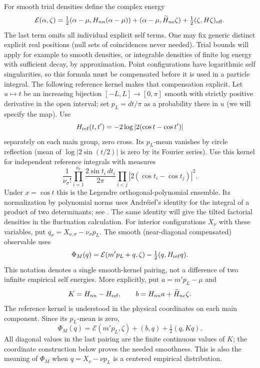 For smooth trial densities define the complex energy
\[
 \mathcal E(\alpha,\zeta)=\tfrac12(\alpha-\mu,H_{nn}(\alpha-\mu))
 +(\alpha-\mu,\widetilde H_{ne}\zeta)+\tfrac12(\zeta,H\zeta)_{\rm off}.
\]
The last term omits all individual explicit self terms. One may fix generic distinct explicit real positions (null sets of coincidences never needed). Trial bounds will apply for example to smooth densities, or integrable densities of finite log energy with sufficient decay, by approximation. Point configurations have logarithmic self singularities, so this
formula must be compensated before it is used in a particle integral.
The following reference kernel makes that compensation explicit. Let \(u\mapsto t\) be an increasing bijection \([-L,L]\to[0,\pi]\) smooth with strictly positive derivative in the open interval; set \(p_L=dt/\pi\) as a probability there in \(u\) (we will specify the map). Use
\[
 H_{\rm ref}(t,t')=-2\log|2(\cos t-\cos t')|
\]
separately on each main group, zero cross. Its \(p_L\)-mean vanishes by circle reflection (mean of \(\log|2\sin(t/2)|\) is zero by its Fourier series). Use this kernel for independent reference integrals with measures
\[
 \frac{1}{\nu_\sigma!}\prod_{i=1}^{\nu_\sigma}\frac{2\sin t_i\,dt_i}{2\pi}
 \prod_{i<j}|2(\cos t_i-\cos t_j)|^2 .
\]
Under $x=\cos t$ this is the Legendre orthogonal-polynomial ensemble.
Its normalization by polynomial norms uses Andr\'eief's identity for
the integral of a product of two determinants; see
\cite[equations (1.3), (3.1), and Section 5]{TracyWidom1998}.
The same identity will give
the tilted factorial densities in the fluctuation calculation.
For interior configurations \(X_\nu\) with these variables, put \(q_\sigma=X_{\nu,\sigma}-\nu_\sigma p_L\). The smooth (near-diagonal compensated) observable uses
\[
 \Phi_M(q)=\mathcal E(m'p_L+q,\zeta)-\tfrac12(q,H_{\rm ref}q).
\]
This notation denotes a single smooth-kernel pairing, not a difference
of two infinite empirical self energies. More explicitly, put
\(a=m'p_L-\mu\) and
\[
 K=H_{nn}-H_{\rm ref},\qquad
 b=H_{nn}a+\widetilde H_{ne}\zeta.
\]
The reference kernel is understood in the physical coordinates on
each main component. Since its \(p_L\)-mean is zero,
\[
 \Phi_M(q)=\mathcal E(m'p_L,\zeta)+(b,q)+\tfrac12(q,Kq).
\]
All diagonal values in the last pairing are the finite continuous
values of \(K\); the coordinate construction below proves the needed
smoothness. This is also the meaning of \(\Phi_M\) when
\(q=X_\nu-\nu p_L\) is a centered empirical distribution.
